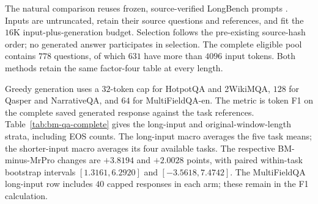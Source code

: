 The natural comparison reuses frozen, source-verified LongBench prompts
\citep{bai2024longbench}. Inputs are untruncated, retain their source questions
and references, and fit the $16$K input-plus-generation budget.
Selection follows the pre-existing source-hash order; no generated answer
participates in selection. The complete eligible pool contains $778$ questions,
of which $631$ have more than $4096$ input tokens.
Both methods retain the same factor-four table at every length.

Greedy generation uses a $32$-token cap for HotpotQA and 2WikiMQA,
$128$ for Qasper and NarrativeQA, and $64$ for MultiFieldQA-en.
The metric is token F1 on the complete saved generated response against
the task references. Table~\ref{tab:bm-qa-complete} gives the long-input
and original-window-length strata, including EOS counts.
The long-input macro averages the five task means; the shorter-input macro
averages its four available tasks. The respective BM-minus-MrPro changes are
$+3.8194$ and $+2.0028$ points, with paired within-task bootstrap intervals
$[1.3161,6.2920]$ and $[-3.5618,7.4742]$.
The MultiFieldQA long-input row includes $40$ capped responses in each arm;
these remain in the F1 calculation.


